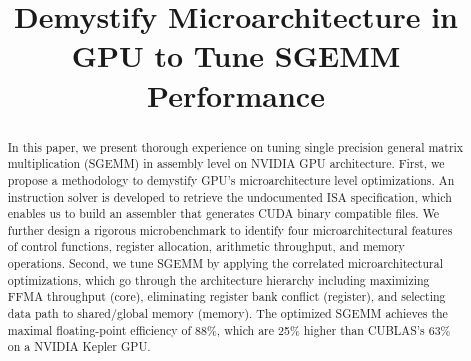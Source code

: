 \documentclass{sig-alternate-05-2015}
\begin{document}






\title{Demystify Microarchitecture in GPU to Tune SGEMM Performance}
\subtitle{}


\maketitle

\begin{abstract}
	In this paper, we present thorough experience on tuning single precision general matrix multiplication (SGEMM) in assembly level on NVIDIA GPU architecture. First, we propose a methodology to demystify GPU's microarchitecture level optimizations. An instruction solver is developed to retrieve the undocumented ISA specification, which enables us to build an assembler that generates CUDA binary compatible files. We further design a rigorous microbenchmark to identify four microarchitectural features of control functions, register allocation, arithmetic throughput, and memory operations. Second, we tune SGEMM by applying the correlated microarchitectural optimizations, which go through the architecture hierarchy including maximizing FFMA throughput (core), eliminating register bank conflict (register), and selecting data path to shared/global memory (memory). The optimized SGEMM achieves the maximal floating-point efficiency of 88\%, which are 25\% higher than CUBLAS's 63\% on a NVIDIA Kepler GPU.
\end{abstract}


\end{document}
